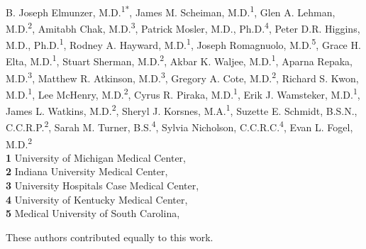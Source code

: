 \documentclass[
  10pt,
  letterpaper,
]{article}
\begin{document}
\vspace*{0.2in}

\begin{flushleft}
{\Large
\textbf{} %
}
\newline
\\
B. Joseph Elmunzer, M.D.\textsuperscript{1*}, James M. Scheiman,
M.D.\textsuperscript{1}, Glen A. Lehman,
M.D.\textsuperscript{2}, Amitabh Chak, M.D.\textsuperscript{3}, Patrick
Mosler, M.D., Ph.D.\textsuperscript{4}, Peter D.R. Higgins, M.D.,
Ph.D.\textsuperscript{1}, Rodney A. Hayward,
M.D.\textsuperscript{1}, Joseph Romagnuolo,
M.D.\textsuperscript{5}, Grace H. Elta, M.D.\textsuperscript{1}, Stuart
Sherman, M.D.\textsuperscript{2}, Akbar K. Waljee,
M.D.\textsuperscript{1}, Aparna Repaka, M.D.\textsuperscript{3}, Matthew
R. Atkinson, M.D.\textsuperscript{3}, Gregory A. Cote,
M.D.\textsuperscript{2}, Richard S. Kwon, M.D.\textsuperscript{1}, Lee
McHenry, M.D.\textsuperscript{2}, Cyrus R. Piraka,
M.D.\textsuperscript{1}, Erik J. Wamsteker,
M.D.\textsuperscript{1}, James L. Watkins,
M.D.\textsuperscript{2}, Sheryl J. Korsnes,
M.A.\textsuperscript{1}, Suzette E. Schmidt, B.S.N.,
C.C.R.P.\textsuperscript{2}, Sarah M. Turner,
B.S.\textsuperscript{4}, Sylvia Nicholson,
C.C.R.C.\textsuperscript{4}, Evan L. Fogel, M.D.\textsuperscript{2}
\\
\bigskip
\textbf{1} University of Michigan Medical Center, \\ \textbf{2} Indiana
University Medical Center, \\ \textbf{3} University Hospitals Case
Medical Center, \\ \textbf{4} University of Kentucky Medical
Center, \\ \textbf{5} Medical University of South Carolina, 
\bigskip

% 
%
\Yinyang These authors contributed equally to this work.


\end{flushleft}
\end{document}
